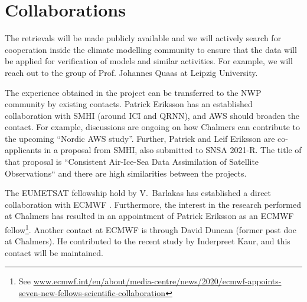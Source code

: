 \documentclass[12pt,oneside,a4paper]{article}
\begin{document}


\section{Collaborations}
%
\label{sec:collaborations}
The retrievals will be made publicly available and we will actively search
for cooperation inside the climate modelling community to ensure that the 
data will be applied for verification of models and similar activities. For example, we will reach out to the group of Prof. Johannes Quaas at Leipzig University. 


The experience obtained in the project can be transferred to the NWP community
by existing contacts. Patrick Eriksson has an established collaboration with
SMHI (around ICI and QRNN), and AWS should broaden the contact. For example,
discussions are ongoing on how Chalmers can contribute to the upcoming
``Nordic AWS study''. Further, Patrick and Leif Eriksson are co-applicants in a
proposal from SMHI, also submitted to SNSA 2021-R. The title of that proposal
is ``Consistent Air-Ice-Sea Data Assimilation of Satellite Observations`` and
there are high similarities between the projects.

The EUMETSAT fellowship hold by V.\ Barlakas has established a direct
collaboration with ECMWF \citep{barlakas:intro:21}. Furthermore, the interest
in the research performed at Chalmers has resulted in an appointment of Patrick
Eriksson as an ECMWF fellow\footnote{See 
	\url{www.ecmwf.int/en/about/media-centre/news/2020/ecmwf-appoints-seven-new-fellows-scientific-collaboration}}.
Another contact at ECMWF is through David Duncan (former post doc at Chalmers).
He contributed to the recent study by Inderpreet Kaur, and this contact will be
maintained.
\end{document}
